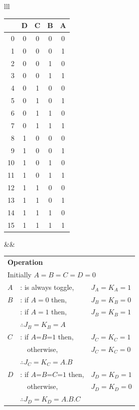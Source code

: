 \vspace{4em}
\begin{tabular}{lll}
   \begin{adjustbox}{valign=t}
   \begin{tabularx}{7cm}{|r|C|C|C|C|}\hline
      & D & C & B & A \\ & 0 & 0 & 0 & 0 \\
      1 & 0 & 0 & 0 & 1 \\
      2 & 0 & 0 & 1 & 0 \\
      3 & 0 & 0 & 1 & 1 \\
      4 & 0 & 1 & 0 & 0 \\
      5 & 0 & 1 & 0 & 1 \\
      6 & 0 & 1 & 1 & 0 \\
      7 & 0 & 1 & 1 & 1 \\
      8 & 1 & 0 & 0 & 0 \\
      9 & 1 & 0 & 0 & 1 \\
      10 & 1 & 0 & 1 & 0 \\
      11 & 1 & 0 & 1 & 1 \\
      12 & 1 & 1 & 0 & 0 \\
      13 & 1 & 1 & 0 & 1 \\
      14 & 1 & 1 & 1 & 0 \\
      15 & 1 & 1 & 1 & 1 \\\hline
   \end{tabularx}
   \end{adjustbox}
   &\vspace{2ex}&
\begin{adjustbox}{valign=t}
\begin{tabularx}{7cm}{lXl}
   \multicolumn{3}{l}{\textbf{Operation}}\\
   \multicolumn{3}{l}{Initially $A=B=C=D=0$}\\[1em]
   $A$ & : is always toggle,& $J_A = K_A = 1$ \\[1em]
   $B$ & : if $A=0$ then,& $J_B = K_B = 0$ \\
      & : if $A=1$ then,& $J_B = K_B = 1$ \\
   &\multicolumn{2}{l}{$\therefore J_B = K_B = A$}\\[1em]
   $C$ & : if $A\text{=}B\text{=}1$ then,& $J_C = K_C = 1$ \\
      & \ \ otherwise,& $J_C = K_C = 0$ \\
   &\multicolumn{2}{l}{$\therefore J_C = K_C = A.B$}\\[1em]
   $D$ & : if $A\text{=}B\text{=}C\text{=}1$ then,& $J_D = K_D = 1$ \\
      & \ \ otherwise,& $J_D = K_D = 0$ \\
   &\multicolumn{2}{l}{$\therefore J_D = K_D = A.B.C$}\\
\end{tabularx}
\end{adjustbox}
\end{tabular}

